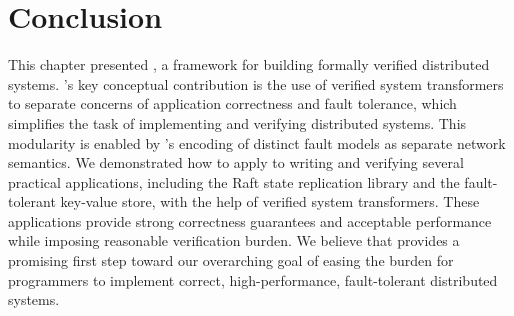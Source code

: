 \section{Conclusion}\label{sec:verdi:conclusion}

This chapter presented \Verdi, a framework for building formally
verified distributed systems.  \Verdi's key conceptual contribution is
the use of verified system transformers to separate concerns of
application correctness and fault tolerance, which simplifies the task
of implementing and verifying distributed systems. This
modularity is enabled by \Verdi's encoding of distinct fault models as
separate network semantics.  We demonstrated how to apply \Verdi to
writing and verifying several practical applications, including the
Raft state replication library and the \vard fault-tolerant key-value
store, with the help of verified system transformers.  These
applications provide strong correctness guarantees and acceptable
performance while imposing reasonable verification burden. We believe
that \Verdi provides a promising first step toward our overarching
goal of easing the burden for programmers to implement correct,
high-performance, fault-tolerant distributed systems.
